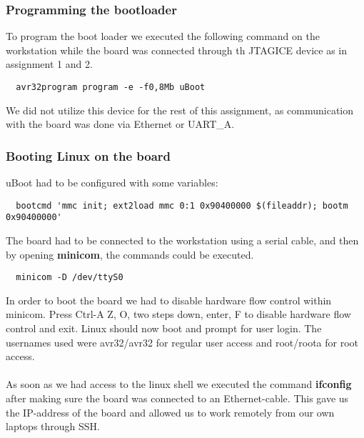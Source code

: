 \subsubsection{Programming the bootloader}
To program the boot loader we executed the following command on the workstation while the
board was connected through th JTAGICE device as in assignment 1 and 2.
\begin{verbatim}
  avr32program program -e -f0,8Mb uBoot
\end{verbatim}
We did not utilize this device for the rest of this assignment, as communication with the board
was done via Ethernet or UART\_A.

\subsubsection{Booting Linux on the board}
uBoot had to be configured with some variables:
\begin{verbatim}
  bootcmd 'mmc init; ext2load mmc 0:1 0x90400000 $(fileaddr); bootm 0x90400000'
\end{verbatim}
The board had to be connected to the workstation using a serial cable, and then by opening {\bf minicom}, the commands could be executed.
\begin{verbatim}
  minicom -D /dev/ttyS0
\end{verbatim}
In order to boot the board we had to disable hardware flow control within minicom.
Press Ctrl-A Z, O, two steps down, enter, F to disable hardware flow control and exit.
Linux should now boot and prompt for user login. The usernames used were avr32/avr32 for
regular user access and root/roota for root access.\\
\\
As soon as we had access to the linux shell we executed the command {\bf ifconfig} after
making sure the board was connected to an Ethernet-cable. This gave us the IP-address of the
board and allowed us to work remotely from our own laptops through SSH.
